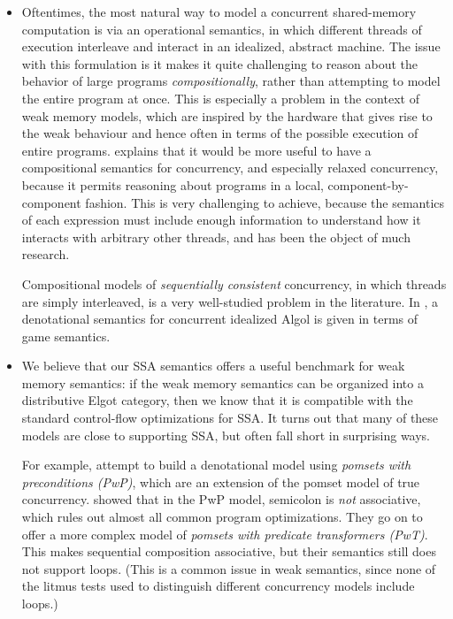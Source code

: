 \documentclass[acmsmall,screen,review]{acmart}
\begin{document}
\begin{itemize}

  \item Oftentimes, the most natural way to model a concurrent shared-memory computation is via an
  operational semantics, in which different threads of execution interleave and interact in an
  idealized, abstract machine. The issue with this formulation is it makes it quite challenging to
  reason about the behavior of large programs \emph{compositionally}, rather than attempting to
  model the entire program at once. This is especially a problem in the context of weak memory
  models, which are inspired by the hardware that gives rise to the weak behaviour and hence often
  in terms of the possible execution of entire programs. \citet{batty-compositional-17} explains
  that it would be more useful to have a compositional semantics for concurrency, and especially
  relaxed concurrency, because it permits reasoning about programs in a local,
  component-by-component fashion. This is very challenging to achieve, because the semantics of each
  expression must include enough information to understand how it interacts with arbitrary other
  threads, and has been the object of much research.
  
  Compositional models of \emph{sequentially consistent} concurrency, in which threads are simply
  interleaved, is a very well-studied problem in the literature. In \citet{abramsky-algol-96}, a
  denotational semantics for concurrent idealized Algol is given in terms of game semantics.

  \item  We believe that our SSA semantics offers a useful benchmark for weak memory semantics: if
  the weak memory semantics can be organized into a distributive Elgot category, then we know that
  it is compatible with the standard control-flow optimizations for SSA. It turns out that many of
  these models are close to supporting SSA, but often fall short in surprising ways. 
  
  For example, \citet{jagadeesan-pwp-20} attempt to build a denotational model using \emph{pomsets
  with preconditions (PwP)}, which are an extension of the pomset model of true concurrency.
  \citet{leaky-semicolon} showed that in the PwP model, semicolon is \emph{not} associative, which
  rules out almost all common program optimizations.  They go on to offer a more complex model of
  \emph{pomsets with predicate transformers (PwT)}. This makes sequential composition associative, but
  their semantics still does not support loops. (This is a common issue in weak semantics, since none
  of the litmus tests used to distinguish different concurrency models include loops.)
  

\end{itemize}
\end{document}

